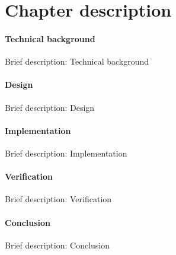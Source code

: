 \section{Chapter description}
		\paragraph{Technical background}

Brief description: Technical background

		\paragraph{Design}

Brief description: Design

		\paragraph{Implementation}

Brief description: Implementation

		\paragraph{Verification}

Brief description: Verification

		\paragraph{Conclusion}

Brief description: Conclusion


